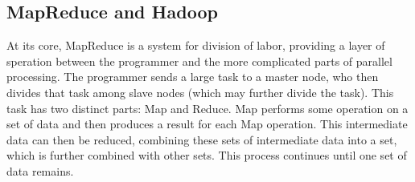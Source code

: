 \documentclass[10pt, conference, compsocconf]{IEEEtran}
\begin{document}







\subsection{MapReduce and Hadoop}
At its core, MapReduce \cite{mapreduce} is a system for division of labor, providing a layer of speration between the programmer and the more complicated parts of parallel processing.  The programmer sends a large task to a master node, who then divides that task among slave nodes (which may further divide the task).  This task has two distinct parts: Map and Reduce.  Map performs some operation on a set of data and then produces a result for each Map operation.  This intermediate data can then be reduced, combining these sets of intermediate data into a set, which is further combined with other sets.  This process continues until one set of data remains.
\end{document}
